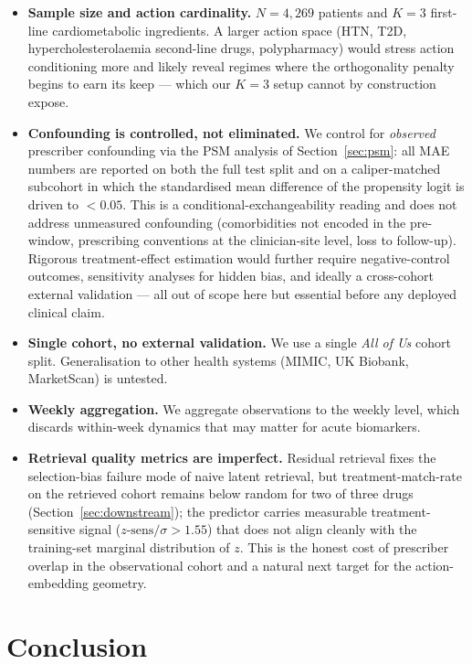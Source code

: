 \begin{itemize}[leftmargin=*,itemsep=2pt]
  \item \textbf{Sample size and action cardinality.} $N{=}4{,}269$
  patients and $K{=}3$ first-line cardiometabolic ingredients. A larger
  action space (HTN, T2D, hypercholesterolaemia second-line drugs,
  polypharmacy) would stress action conditioning more and likely reveal
  regimes where the orthogonality penalty begins to earn its keep
  --- which our $K{=}3$ setup cannot by construction expose.
  \item \textbf{Confounding is controlled, not eliminated.} We control
  for \emph{observed} prescriber confounding via the PSM analysis of
  Section~\ref{sec:psm}: all MAE numbers are reported on both the full
  test split and on a caliper-matched subcohort in which the
  standardised mean difference of the propensity logit is driven to
  $<0.05$. This is a conditional-exchangeability reading and does not
  address unmeasured confounding (comorbidities not encoded in the
  pre-window, prescribing conventions at the clinician-site level, loss
  to follow-up). Rigorous treatment-effect estimation would further
  require negative-control outcomes, sensitivity analyses for hidden
  bias, and ideally a cross-cohort external validation --- all out of
  scope here but essential before any deployed clinical claim.
  \item \textbf{Single cohort, no external validation.} We use a single
  \emph{All of Us} cohort split. Generalisation to other health systems
  (MIMIC, UK Biobank, MarketScan) is untested.
  \item \textbf{Weekly aggregation.} We aggregate observations to the
  weekly level, which discards within-week dynamics that may matter for
  acute biomarkers.
  \item \textbf{Retrieval quality metrics are imperfect.} Residual
  retrieval fixes the selection-bias failure mode of naive latent
  retrieval, but treatment-match-rate on the retrieved cohort remains
  below random for two of three drugs (Section~\ref{sec:downstream});
  the predictor carries measurable treatment-sensitive signal
  ($z\text{-sens}/\sigma > 1.55$) that does not align cleanly with the
  training-set marginal distribution of $z$. This is the honest cost of
  prescriber overlap in the observational cohort and a natural next
  target for the action-embedding geometry.
\end{itemize}

\section{Conclusion}

